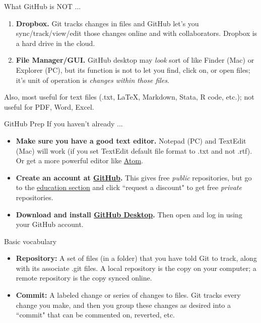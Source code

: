 \documentclass[12pt, compress]{beamer} %
\renewcommand{\texttt}[2][ceruleanblue]{\textcolor{#1}{\ttfamily #2}}%
\let\noteitem\item %
\renewcommand{\item}{ 
	\noteitem\vspace{\fill}
	}
\newcommand{\nb}[1]{{\color{burntorange} {#1}}}
\begin{document}
	\begin{frame}{What GitHub is NOT ... }
		\begin{enumerate}
			\item \textbf{Dropbox.} Git tracks changes in files and GitHub let's you sync/track/view/edit those changes online and with collaborators. Dropbox is a hard drive in the cloud. 
			\item \textbf{File Manager/GUI.} GitHub desktop may \textit{look} sort of like Finder (Mac) or Explorer (PC), but its function is not to let you find, click on, or open files; it's unit of operation is \textit{changes within those files}.
		\end{enumerate}
		
		\bigskip \centering
		\nb{Also, most useful for text files (.txt, \LaTeX, Markdown, Stata, R code, etc.); not useful for PDF, Word, Excel.}
	\end{frame}

	\begin{frame}{GitHub Prep}
		If you haven't already ...
		\begin{itemize}
			\item \textbf{Make sure you have a good text editor.} Notepad (PC) and TextEdit (Mac) will work (if you set TextEdit default file format to \texttt{.txt} and not \texttt{.rtf}). Or get a more powerful editor like \href{https://atom.io/}{Atom}. 
			\item \textbf{Create an account at \href{http://www.github.com}{GitHub}.} This gives free \textit{public} repositories, but go to the \href{https://education.github.com/}{education section} and click ``request a discount" to get free \textit{private} repositories. 
			\item \textbf{Download and install \href{https://desktop.github.com/}{GitHub Desktop}.} Then open and log in using your GitHub account.
		\end{itemize}
	\end{frame}

	\begin{frame}{Basic vocabulary}
		\begin{itemize}
			\item \nb{\textbf{Repository:}} A set of files (in a folder) that you have told Git to track, along with its associate .git files. A \nb{local} repository is the copy on your computer; a \nb{remote} repository is the copy synced online.
			\item \nb{\textbf{Commit:}} A labeled change or series of changes to files. Git tracks every change you make, and then you group these changes as desired into a ``commit" that can be commented on, reverted, etc.
		\end{itemize}
	\end{frame}
\end{document}
